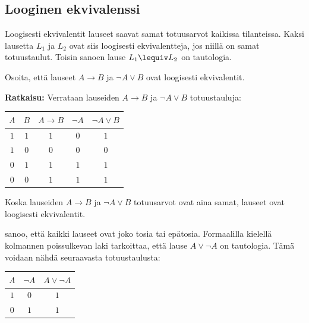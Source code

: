 \subsection*{Looginen ekvivalenssi}  Loogisesti
ekvivalentit lauseet saavat samat totuusarvot
kaikissa tilanteissa. Kaksi lausetta $L_1$ ja
$L_2$ ovat siis  loogisesti ekvivalentteja, jos niillä
on samat totuustaulut. Toisin sanoen lause $L_1 \lequiv L_2$ on tautologia.

\begin{esimerkki}
 Osoita, että lauseet $A\to B$ ja $\lnot A \lor B$ ovat loogisesti
ekvivalentit.

{\bf Ratkaisu:}
Verrataan lauseiden $A\to B$ ja $\lnot A \lor B$
totuustauluja: 

\begin{center}
\begin{tabular}{|c|c|c|c|c|}\hline
$A$ & $B$ & $A\to B$ & $\lnot A$ & $\lnot A\lor B$ \\ \hline
$1$ & $1$ & $1$ & $0$ & $1$  \\ %
$1$ & $0$ & $0$ & $0$ & $0$  \\
$0$ & $1$ & $1$ & $1$ & $1$  \\
$0$ & $0$ & $1$ & $1$ & $1$  \\ \hline
\end{tabular}
\end{center}

Koska lauseiden $A\to B$ ja $\lnot A \lor B$ totuusarvot
ovat aina samat, lauseet ovat loogisesti ekvivalentit.
\end{esimerkki}

 sanoo, että kaikki lauseet ovat joko tosia tai epätosia. Formaalilla kielellä kolmannen poissulkevan laki tarkoittaa, että lause $A \lor \lnot A$ on tautologia. Tämä voidaan nähdä seuraavasta totuustaulusta:

\bigskip

\begin{center}
\begin{tabular}{|c|c|c|}\hline
$A$ & $\lnot A$ & $A \lor  \lnot A$ \\ \hline
$1$ & $0$ & $1$\\
$0$ & $1$ & $1$\\ \hline
\end{tabular}
\end{center}

\bigskip


